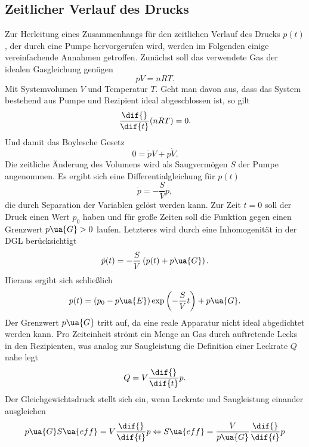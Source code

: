 \subsection{Zeitlicher Verlauf des Drucks}
Zur Herleitung eines Zusammenhangs für den zeitlichen Verlauf des Drucks $p(t)$, der durch eine Pumpe
hervorgerufen wird, werden im Folgenden einige vereinfachende Annahmen getroffen. Zunächst soll das
verwendete Gas der idealen Gasgleichung genügen
\begin{equation}
  p V = n R T.
  \label{eq: ideale_gasgleichung}
\end{equation}
Mit Systemvolumen $V$ und Temperatur $T$. Geht man davon aus, dass das System bestehend aus
Pumpe und Rezipient ideal abgeschlossen ist, so gilt
\begin{equation}
  \frac{\dif{}}{\dif{t}}(n R T ) = 0.
\end{equation}
Und damit das Boylesche Gesetz
\begin{equation}
  0 = \dot{p}V  + p\dot{V}.
\end{equation}
Die zeitliche Änderung des Volumens wird als Saugvermögen $S$ der Pumpe angenommen. Es ergibt sich eine Differentialgleichung für $p(t)$
\begin{equation}
  \dot{p} = - \frac{S}{V} p,
\end{equation}
die durch Separation der Variablen gelöst werden kann. Zur Zeit $t = 0$ soll der Druck einen Wert $p_0$ haben und für große
Zeiten soll die Funktion gegen einen Grenzwert $p\ua{G} > 0$ laufen. Letzteres wird durch eine Inhomogenität in der DGL berücksichtigt
\begin{equation}
  \dot{p}(t) = - \frac{S}{V} \left(p(t) + p\ua{G}\right).
\end{equation}
Hieraus ergibt sich schließlich
\begin{equation}
  p(t) = (p_0 - p\ua{E})\exp\left(- \frac{S}{V} t \right) + p\ua{G}.
  \label{eq: evakuierungskurve}
\end{equation}
Der Grenzwert $p\ua{G}$ tritt auf, da eine reale Apparatur nicht ideal abgedichtet werden kann. Pro Zeiteinheit
strömt ein Menge an Gas durch auftretende Lecks in den Rezipienten, was analog zur Saugleistung
die Definition einer Leckrate $Q$ nahe legt
\begin{equation}
  Q = V \frac{\dif{}}{\dif{t}} p.
\end{equation}
Der Gleichgewichtsdruck stellt sich ein, wenn Leckrate und Saugleistung einander ausgleichen
\begin{equation}
  p\ua{G} S\ua{eff} =  V \frac{\dif{}}{\dif{t}} p \Leftrightarrow
  S\ua{eff} =  \frac{V}{p\ua{G}} \frac{\dif{}}{\dif{t}} p
\end{equation}
